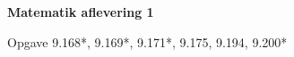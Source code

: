 \documentclass[12pt]{article}
\begin{document}
\Large\textbf{Matematik aflevering 1}
\normalsize

Opgave 9.168*, 9.169*, 9.171*, 9.175, 9.194, 9.200* 
\end{document}
